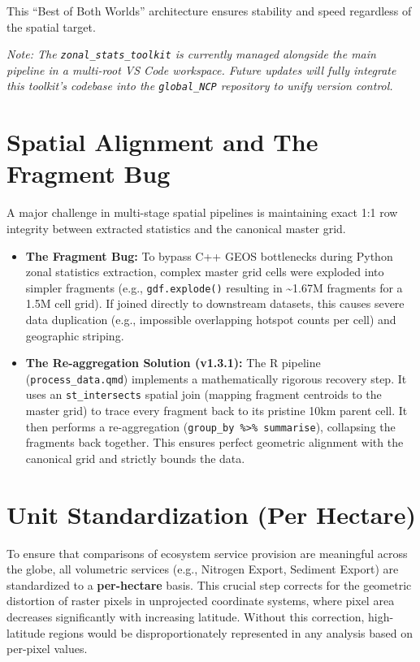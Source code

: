 \documentclass[
  letterpaper,
  DIV=11,
  numbers=noendperiod]{scrreprt}
\providecommand{\tightlist}{%
  \setlength{\itemsep}{0pt}\setlength{\parskip}{0pt}}
\begin{document}
This ``Best of Both Worlds'' architecture ensures stability and speed
regardless of the spatial target.

\emph{Note: The \texttt{zonal\_stats\_toolkit} is currently managed
alongside the main pipeline in a multi-root VS Code workspace. Future
updates will fully integrate this toolkit's codebase into the
\texttt{global\_NCP} repository to unify version control.}

\section{Spatial Alignment and The Fragment
Bug}\label{spatial-alignment-and-the-fragment-bug}

A major challenge in multi-stage spatial pipelines is maintaining exact
1:1 row integrity between extracted statistics and the canonical master
grid.

\begin{itemize}
\tightlist
\item
  \textbf{The Fragment Bug:} To bypass C++ GEOS bottlenecks during
  Python zonal statistics extraction, complex master grid cells were
  exploded into simpler fragments (e.g., \texttt{gdf.explode()}
  resulting in \textasciitilde1.67M fragments for a 1.5M cell grid). If
  joined directly to downstream datasets, this causes severe data
  duplication (e.g., impossible overlapping hotspot counts per cell) and
  geographic striping.
\item
  \textbf{The Re-aggregation Solution (v1.3.1):} The R pipeline
  (\texttt{process\_data.qmd}) implements a mathematically rigorous
  recovery step. It uses an \texttt{st\_intersects} spatial join
  (mapping fragment centroids to the master grid) to trace every
  fragment back to its pristine 10km parent cell. It then performs a
  re-aggregation (\texttt{group\_by\ \%\textgreater{}\%\ summarise}),
  collapsing the fragments back together. This ensures perfect geometric
  alignment with the canonical grid and strictly bounds the data.
\end{itemize}

\section{Unit Standardization (Per
Hectare)}\label{unit-standardization-per-hectare}

To ensure that comparisons of ecosystem service provision are meaningful
across the globe, all volumetric services (e.g., Nitrogen Export,
Sediment Export) are standardized to a \textbf{per-hectare} basis. This
crucial step corrects for the geometric distortion of raster pixels in
unprojected coordinate systems, where pixel area decreases significantly
with increasing latitude. Without this correction, high-latitude regions
would be disproportionately represented in any analysis based on
per-pixel values.
\end{document}
